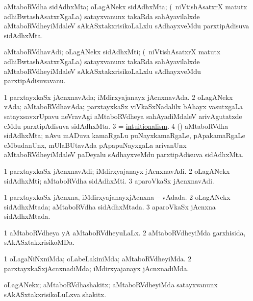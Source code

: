 \bentry
{}
\gl{\nA}
\bmng
aMtaboRVdha sidAdhxMta; oLagANekx sidAdhxMta; (\kanmu\ niVtishAsatxrX matutx adhiBwtashAsatxrXgaLa) satayxvanunx takaRda sahAyavilalxde aMtaboRVdheyiMdaleV sAkASxtakxrisikoLaLxlu sAdhayxveMdu parxtipAdisuva sidAdhxMta. 
\emng
\eentry

\bentry
{}
\gl{\nA}
\bmng
aMtaboRVdhavAdi; oLagANekx sidAdhxMti; (\kanmu\ niVtishAsatxrX matutx adhiBwtashAsatxrXgaLa) satayxvanunx takaRda sahAyavilalxde aMtaboRVdheyiMdaleV sAkASxtakxrisikoLaLxlu sAdhayxveMdu parxtipAdisuvavanu. 
\emng
\eentry

\bentry
{}
\gl{\nA}
\bmng
\bnum
\num{1} parxtayxkaSx jAcnxnavAda; iMdirxyajanayx jAcnxnavAda. 
\num{2} oLagANekx vAda; aMtaboRVdhavAda; parxtayxkaSx viVkaSxNadalilx bAhayx vasutxgaLa satayxsavxrUpavu neVravAgi aMtaboRVdheya sahAyadiMdaleV arivAgutatxde eMdu parxtipAdisuva sidAdhxMta. 
\num{3} =  \hyperlink{intuitionalism}{intuitionalism}. 
\num{4} (\niVshA) aMtaboRVdha sidAdhxMta; nAvu mADuva kamaRgaLu puNayxkamaRgaLe, pApakamaRgaLe eMbudanUnx, mUlaBUtavAda pApapuNayxgaLa arivanUnx aMtaboRVdheyiMdaleV paDeyalu sAdhayxveMdu parxtipAdisuva sidAdhxMta. 
\enum
\emng
\eentry

\bentry
{}
\gl{\nA}
\bmng
\bnum
\num{1} parxtayxkaSx jAcnxnavAdi; iMdirxyajanayx jAcnxnavAdi. 
\num{2} oLagANekx sidAdhxMti; aMtaboRVdha sidAdhxMti. 
\num{3} aparoVkaSx jAcnxnavAdi. 
\enum
\emng
\eentry

\bentry
{}
\gl{\gu}
\bmng
\bnum
\num{1} parxtayxkaSx jAcnxna, iMdirxyajanayxjAcnxna -- vAdada. 
\num{2} oLagANekx sidAdhxMtada; aMtaboRVdha sidAdhxMtada. 
\num{3} aparoVkaSx jAcnxna sidAdhxMtada. 
\enum
\emng
\eentry

\bentry
{}
\gl{\gu}
\bmng
\bnum
\num{1} aMtaboRVdheya yA aMtaboRVdheyuLaLx. 
\num{2} aMtaboRVdheyiMda garxhisida, sAkASxtakxrisikoMDa. 
\enum
\emng
\eentry

\bentry
{}
\gl{\kirxvi}
\bmng
\bnum
\num{1} oLagaNiNxniMda; oLabeLakiniMda; aMtaboRVdheyiMda. 
\num{2} parxtayxkaSxjAcnxnadiMda; iMdirxyajanayx jAcnxnadiMda. 
\enum
\emng
\eentry

\bentry
{}
\gl{\nA}
\bmng
oLagANekx; aMtaboRVdhashakitx; aMtaboRVdheyiMda satayxvanunx sAkASxtakxrisikoLuLxva shakitx. 
\emng
\eentry

